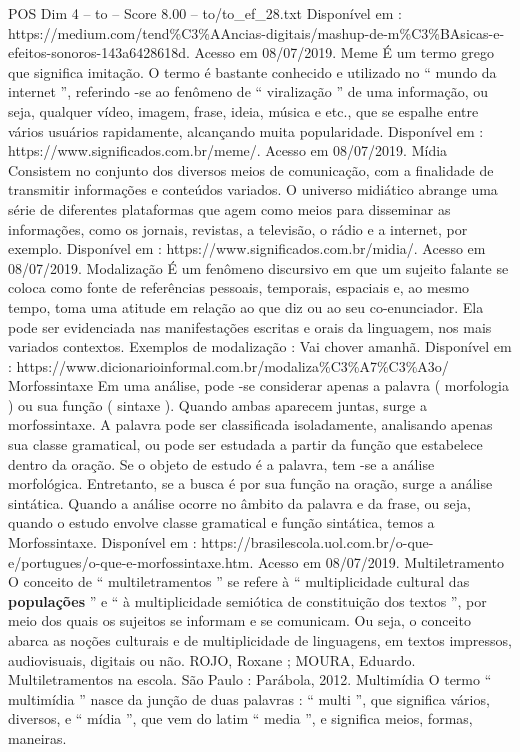 \begin{textsample}{POS Dim 4 – to – Score 8.00 – to/to\_ef\_28.txt}
Disponível em : https://medium.com/tend\%C3\%AAncias-digitais/mashup-de-m\%C3\%BAsicas-e-efeitos-sonoros-143a6428618d.
Acesso em 08/07/2019.
Meme É um termo grego que significa imitação.
O termo é bastante conhecido e utilizado no “ mundo da internet ”, referindo -se ao fenômeno de “ viralização ” de uma informação, ou seja, qualquer vídeo, imagem, frase, ideia, música e etc., que se espalhe entre vários usuários rapidamente, alcançando muita popularidade.
Disponível em : https://www.significados.com.br/meme/.
Acesso em 08/07/2019.
Mídia Consistem no conjunto dos diversos meios de comunicação, com a finalidade de transmitir informações e conteúdos variados.
O universo midiático abrange uma série de diferentes plataformas que agem como meios para disseminar as informações, como os jornais, revistas, a televisão, o rádio e a internet, por exemplo.
Disponível em : https://www.significados.com.br/midia/.
Acesso em 08/07/2019.
Modalização É um fenômeno discursivo em que um sujeito falante se coloca como fonte de referências pessoais, temporais, espaciais e, ao mesmo tempo, toma uma atitude em relação ao que diz ou ao seu co-enunciador.
Ela pode ser evidenciada nas manifestações escritas e orais da linguagem, nos mais variados contextos.
Exemplos de modalização : Vai chover amanhã.
Disponível em : https://www.dicionarioinformal.com.br/modaliza\%C3\%A7\%C3\%A3o/ Morfossintaxe Em uma análise, pode -se considerar apenas a palavra ( morfologia ) ou sua função ( sintaxe ).
Quando ambas aparecem juntas, surge a morfossintaxe.
A palavra pode ser classificada isoladamente, analisando apenas sua classe gramatical, ou pode ser estudada a partir da função que estabelece dentro da oração.
Se o objeto de estudo é a palavra, tem -se a análise morfológica.
Entretanto, se a busca é por sua função na oração, surge a análise sintática.
Quando a análise ocorre no âmbito da palavra e da frase, ou seja, quando o estudo envolve classe gramatical e função sintática, temos a Morfossintaxe.
Disponível em : https://brasilescola.uol.com.br/o-que-e/portugues/o-que-e-morfossintaxe.htm.
Acesso em 08/07/2019.
Multiletramento O conceito de “ multiletramentos ” se refere à “ multiplicidade cultural das \textbf{populações} ” e “ à multiplicidade semiótica de constituição dos textos ”, por meio dos quais os sujeitos se informam e se comunicam.
Ou seja, o conceito abarca as noções culturais e de multiplicidade de linguagens, em textos impressos, audiovisuais, digitais ou não.
ROJO, Roxane ; MOURA, Eduardo.
Multiletramentos na escola.
São Paulo : Parábola, 2012.
Multimídia O termo “ multimídia ” nasce da junção de duas palavras : “ multi ”, que significa vários, diversos, e “ mídia ”, que vem do latim “ media ”, e significa meios, formas, maneiras.

\end{textsample}
